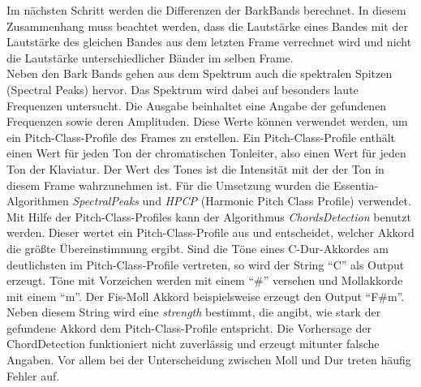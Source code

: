 \documentclass[11pt,a4paper]{article}
\begin{document}
Im nächsten Schritt werden die Differenzen der BarkBands berechnet. In diesem Zusammenhang muss beachtet werden, dass die Lautstärke eines Bandes mit der Lautstärke des gleichen Bandes aus dem letzten Frame verrechnet wird und nicht die Lautstärke unterschiedlicher Bänder im selben Frame.\\
Neben den Bark Bands gehen aus dem Spektrum auch die spektralen Spitzen (Spectral Peaks) hervor. Das Spektrum wird dabei auf besonders laute Frequenzen untersucht. Die Ausgabe beinhaltet eine Angabe der gefundenen Frequenzen sowie deren Amplituden. Diese Werte können verwendet werden, um ein Pitch-Class-Profile des Frames zu erstellen. Ein Pitch-Class-Profile enthält einen Wert für jeden Ton der chromatischen Tonleiter, also einen Wert für jeden Ton der Klaviatur. Der Wert des Tones ist die Intensität mit der der Ton in diesem Frame wahrzunehmen ist. Für die Umsetzung wurden die Essentia-Algorithmen \textit{SpectralPeaks} und \textit{HPCP} (Harmonic Pitch Class Profile) verwendet.\\
Mit Hilfe der Pitch-Class-Profiles kann der Algorithmus \textit{ChordsDetection} benutzt werden. Dieser wertet ein Pitch-Class-Profile aus und entscheidet, welcher Akkord die größte Übereinstimmung ergibt. Sind die Töne eines C-Dur-Akkordes am deutlichsten im Pitch-Class-Profile vertreten, so wird der String ``C'' als Output erzeugt. Töne mit Vorzeichen werden mit einem ``\#'' versehen und Mollakkorde mit einem ``m''. Der Fis-Moll Akkord beispielsweise erzeugt den Output ``F\#m''. Neben diesem String wird eine \textit{strength} bestimmt, die angibt, wie stark der gefundene Akkord dem Pitch-Class-Profile entspricht. Die Vorhersage der ChordDetection funktioniert nicht zuverlässig und erzeugt mitunter falsche Angaben. Vor allem bei der Unterscheidung zwischen Moll und Dur treten häufig Fehler auf.
\end{document}
